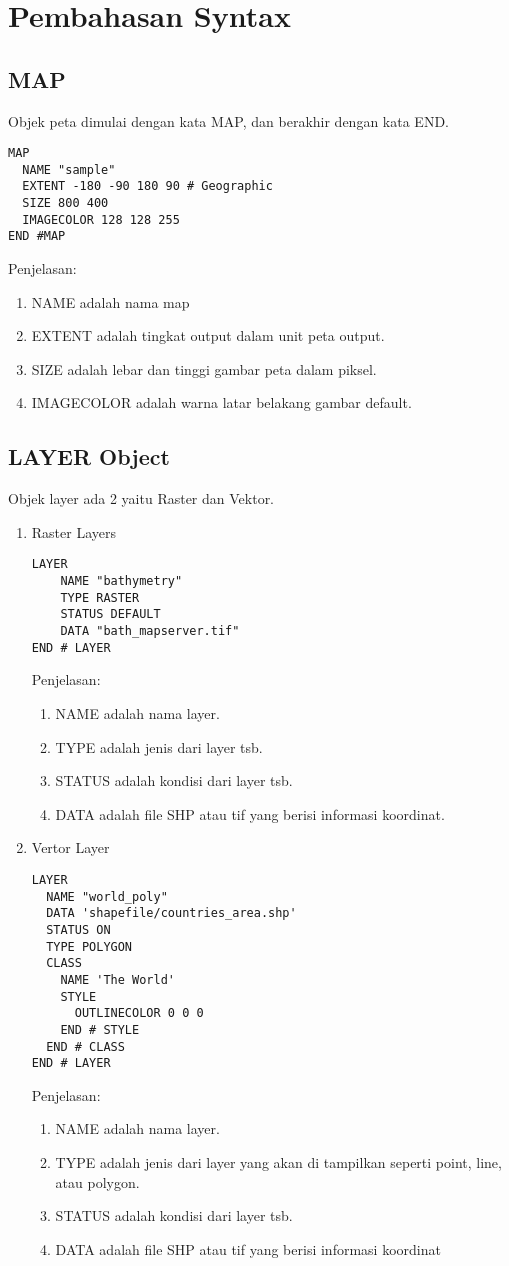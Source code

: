 \section{Pembahasan Syntax}
\subsection{MAP}
Objek peta dimulai dengan kata MAP, dan berakhir dengan kata END.
\begin{lstlisting}
MAP
  NAME "sample"
  EXTENT -180 -90 180 90 # Geographic
  SIZE 800 400
  IMAGECOLOR 128 128 255
END #MAP
\end{lstlisting}

Penjelasan:
\begin{enumerate}
\item NAME adalah nama map
\item EXTENT adalah tingkat output dalam unit peta output.
\item SIZE adalah lebar dan tinggi gambar peta dalam piksel.
\item IMAGECOLOR adalah warna latar belakang gambar default.
\end{enumerate}

\subsection{LAYER Object}
Objek layer ada 2 yaitu Raster dan Vektor.
\begin{enumerate}
\item Raster Layers
\begin{lstlisting}
LAYER
    NAME "bathymetry"
    TYPE RASTER
    STATUS DEFAULT
    DATA "bath_mapserver.tif"
END # LAYER
\end{lstlisting}

Penjelasan:
\begin{enumerate}
\item NAME adalah nama layer.
\item TYPE adalah jenis dari layer tsb.
\item STATUS adalah kondisi dari layer tsb.
\item DATA adalah file SHP atau tif yang berisi informasi koordinat.
\end{enumerate}

\item Vertor Layer
\begin{lstlisting}
LAYER
  NAME "world_poly"
  DATA 'shapefile/countries_area.shp'
  STATUS ON
  TYPE POLYGON
  CLASS
    NAME 'The World'
    STYLE
      OUTLINECOLOR 0 0 0
    END # STYLE
  END # CLASS
END # LAYER
\end{lstlisting}

Penjelasan:
\begin{enumerate}
\item NAME adalah nama layer.
\item TYPE adalah jenis dari layer yang akan di tampilkan seperti point, line, atau polygon.
\item STATUS adalah kondisi dari layer tsb.
\item DATA adalah file SHP atau tif yang berisi informasi koordinat
\end{enumerate}
\end{enumerate}


